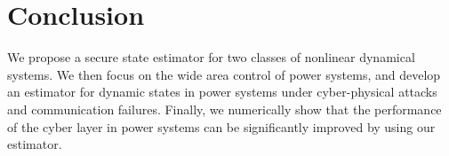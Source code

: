 \documentclass[../../thesis.tex]{subfiles}
\begin{document}





\section{Conclusion}
We propose a secure state estimator for two classes of nonlinear dynamical systems. We then focus on the wide area control of power systems, and develop an estimator for dynamic states in power systems under cyber-physical attacks and communication failures. Finally, we numerically show that the performance of the cyber layer in power systems can be significantly improved by using our estimator. 
\end{document}
